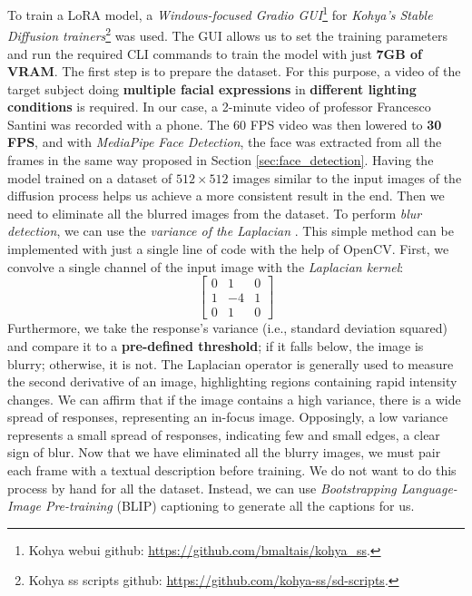 \documentclass[preprint]{elsarticle}
\begin{document}
To train a LoRA model, a \emph{Windows-focused Gradio GUI}\footnote{Kohya webui github: \url{https://github.com/bmaltais/kohya_ss}.} for \emph{Kohya's Stable Diffusion trainers}\footnote{Kohya ss scripts github: \url{https://github.com/kohya-ss/sd-scripts}.} was used. 
The GUI allows us to set the training parameters and run the required 
CLI commands to train the model with just \textbf{7GB of VRAM}. 
The first step is to prepare the dataset. For this purpose, 
a video of the target subject doing \textbf{multiple facial expressions} in \textbf{different lighting conditions} 
is required. In our case, a 2-minute video of professor Francesco Santini was recorded with a phone. 
The 60 FPS video was then lowered to \textbf{30 FPS}, and with \emph{MediaPipe Face Detection},
the face was extracted from all the frames in the same way proposed in Section \ref{sec:face_detection}.
Having the model trained on a dataset of $512\times 512$ images similar to the input images 
of the diffusion process helps us achieve a more consistent result in the end. 
Then we need to eliminate all the blurred images from the dataset. 
To perform \emph{blur detection}, we can use the \emph{variance of the Laplacian} \cite{903548}. 
This simple method can be implemented with just a single line of code with the help of OpenCV. 
First, we convolve a single channel of the input image with the \emph{Laplacian kernel}:
\begin{equation}
	\begin{bmatrix}
		0 & 1 & 0\\
		1 & -4 & 1\\
		0 & 1 & 0
	\end{bmatrix}
\end{equation}
Furthermore, we take the response's variance (i.e., standard deviation squared) 
and compare it to a \textbf{pre-defined threshold}; if it falls below, the image is blurry; otherwise, it is not.
The Laplacian operator is generally used to measure the second derivative of an image, 
highlighting regions containing rapid intensity changes. 
We can affirm that if the image contains a high variance, there is a wide spread of responses, 
representing an in-focus image. Opposingly, a  low variance represents a small spread of responses, 
indicating few and small edges, a clear sign of blur.
Now that we have eliminated all the blurry images, 
we must pair each frame with a textual description before training. 
We do not want to do this process by hand for all the dataset. 
Instead, we can use \emph{Bootstrapping Language-Image Pre-training} (BLIP) captioning \cite{li2022blip} 
to generate all the captions for us. 
\end{document}

